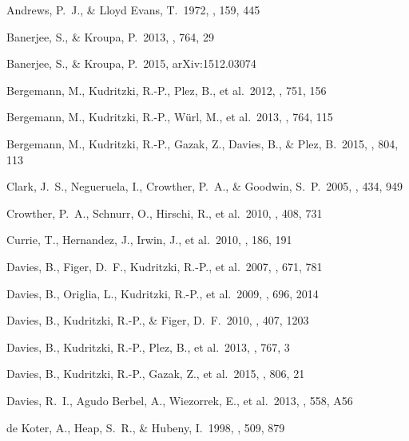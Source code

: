 \documentclass[useAMS,usenatbib]{mn2e}
\begin{document}
\begin{thebibliography}{99}

 Andrews, P.~J., \& Lloyd Evans, T.\ 1972, \mnras, 159, 445

 Banerjee, S., \& Kroupa, P.\ 2013, \apj, 764, 29

 Banerjee, S., \& Kroupa, P.\ 2015, arXiv:1512.03074

 Bergemann, M.,
Kudritzki, R.-P., Plez, B., et al.\ 2012, \apj, 751, 156

 Bergemann, M.,
Kudritzki, R.-P., W{\"u}rl, M., et al.\ 2013, \apj, 764, 115

 Bergemann, M.,
Kudritzki, R.-P., Gazak, Z., Davies, B., \& Plez, B.\ 2015, \apj, 804, 113

 Clark, J.~S., Negueruela, I., Crowther, P.~A., \& Goodwin, S.~P.\ 2005, \aap, 434, 949

 Crowther, P.~A.,
Schnurr, O., Hirschi, R., et al.\ 2010, \mnras, 408, 731

 Currie, T., Hernandez,
J., Irwin, J., et al.\ 2010, \apjs, 186, 191

 Davies, B., Figer,
D.~F., Kudritzki, R.-P., et al.\ 2007, \apj, 671, 781

 Davies, B., Origlia, L.,
Kudritzki, R.-P., et al.\ 2009, \apj, 696, 2014

 Davies, B., Kudritzki,
R.-P., \& Figer, D.~F.\ 2010, \mnras, 407, 1203

 Davies, B., Kudritzki,
R.-P., Plez, B., et al.\ 2013, \apj, 767, 3

 Davies, B., Kudritzki,
R.-P., Gazak, Z., et al.\ 2015, \apj, 806, 21

 Davies, R.~I., Agudo Berbel, A., Wiezorrek, E., et al.\ 2013, \aap, 558, A56

 de Koter, A., Heap,
S.~R., \& Hubeny, I.\ 1998, \apj, 509, 879


\end{thebibliography}
\end{document}
